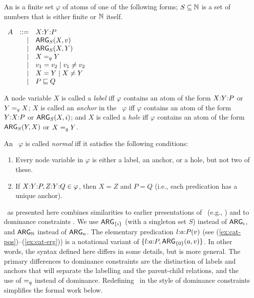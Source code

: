 \begin{definition}\label{defn:rmrs-syntax}
  An \emph{\rmrs} is a finite set $\varphi$ of atoms of one of the
  following forms; $S \subseteq \mathbb{N}$ is a set of numbers that is either
  finite or $\mathbb{N}$ itself.

$\begin{array}{rrll}
A &::= &\ep{X}{Y}{P} \\ %
&| &\ARG_S(X,v) \\ %
&| &\ARG_S(X,Y) \\ %
&| &X \qeq Y \\ %
&| &v_1 = v_2 \;|\; v_1 \neq v_2 \\ %
&| &X = Y \;|\; X \neq Y \\ %
&| &P \spec Q %
\end{array}
$

A node variable $X$ is called a \emph{label} iff $\varphi$ contains an
atom of the form 
$X {:} Y {:} P$ or $Y =_q X$; $X$ is called an
\emph{anchor} in the \rmrs\
$\varphi$ iff $\varphi$ contains an atom of the form
$Y {:} X {:} P$ or $\mathsf{ARG}_S(X,i)$; and $X$ is
called a \emph{hole} iff 
$\varphi$ contains an atom of the form $\mathsf{ARG}_S(Y,X)$ or $X =_q Y$.

An \rmrs\ $\varphi$ is called \emph{normal} iff it satisfies the
following conditions:
\begin{enumerate}
\item Every node variable in $\varphi$ is either a label, an anchor,
  or a hole, but not two of these.
\item If $X {:} Y {:} P, Z {:} Y {:} Q\in \varphi$, then $X=Z$ and $P=Q$
  (i.e., each predication has a unique anchor).
\end{enumerate}
\end{definition}

\rmrs\ as presented here combines similarities to earlier
presentations of \rmrs\ (e.g., \cite{copestake:2003}) and to dominance
constraints \cite{egg:etal:2001}.  We use $\mathsf{ARG}_{\{i\}}$ (with a singleton
set $S$) instead of $\mathsf{ARG}_i$, and $\mathsf{ARG}_{\mathbb{N}}$ instead of $\mathsf{ARG}_n$.
The elementary predication $l {:} a {:} P(v)$ (see
(\ref{ex:cat-pos})--(\ref{ex:cat-erg})) is a
notational variant of $\{l {:} a {:} P, \mathsf{ARG}_{\{0\}}(a,v)\}$.  In other
words, the syntax defined here differs in some details, but is more
general. The primary differences to dominance constraints are the
distinction of labels and anchors that will separate the labelling and
the parent-child relations, and the use of $=_q$ instead of
dominance.  Redefining \rmrs\ in the style of dominance constraints
simplifies the formal work below.

